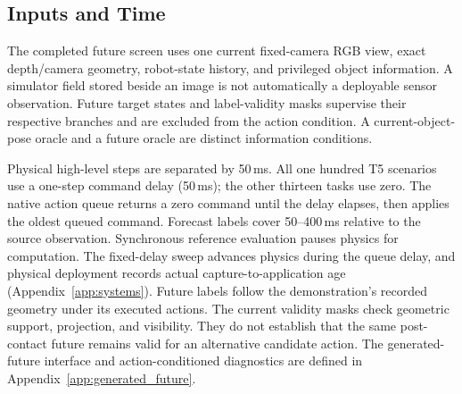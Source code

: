 \subsection{Inputs and Time}
The completed future screen uses one current fixed-camera RGB view, exact
depth/camera geometry, robot-state history, and privileged object information.
A simulator field stored beside an image is not automatically a deployable
sensor observation. Future target states and label-validity masks supervise
their respective branches and are excluded from the action condition.
A current-object-pose oracle and a future oracle are distinct information
conditions.

Physical high-level steps are separated by 50\,ms. All one hundred T5 scenarios
use a one-step command delay (50\,ms); the other thirteen tasks use zero.
The native action queue returns a zero command until the delay elapses,
then applies the oldest queued command. Forecast labels cover
50--400\,ms relative to the source observation. Synchronous reference
evaluation pauses physics for computation. The fixed-delay sweep advances
physics during the queue delay, and physical deployment records actual
capture-to-application age (Appendix~\ref{app:systems}). Future labels follow the demonstration's recorded
geometry under its executed actions. The current validity masks check
geometric support, projection, and visibility. They do not establish that the
same post-contact future remains valid for an alternative candidate action.
The generated-future interface and action-conditioned diagnostics are
defined in Appendix~\ref{app:generated_future}.
